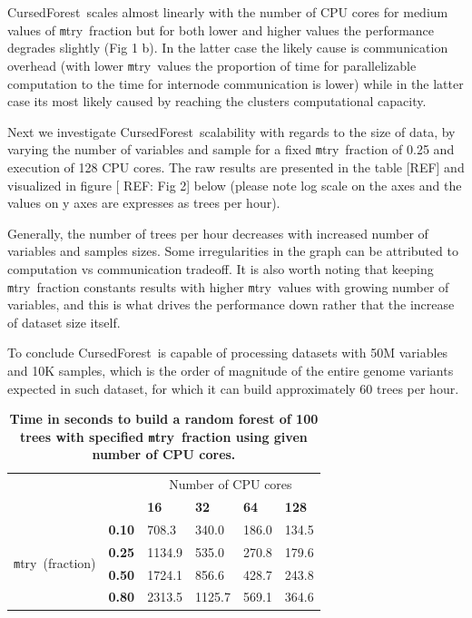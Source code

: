 \documentclass[10pt,letterpaper]{article}
\newcommand{\cursedforest}{{\sc CursedForest}}
\newcommand{\mtry}{{\texttt mtry}}
\begin{document}
\cursedforest{}ales almost linearly with the number of CPU cores for medium values of \mtry\ fraction but for both lower and higher values the performance degrades slightly (Fig 1 b). In the latter case the likely cause is communication overhead (with lower \mtry\ values the proportion of time for parallelizable computation to the time for internode communication is lower) while in the latter case its most likely caused by reaching the clusters computational capacity.

Next we investigate \cursedforest{}alability with regards to the size of data, by varying the number of variables and sample for a fixed \mtry\ fraction of 0.25 and execution of 128 CPU cores. The raw results are presented in the table [REF] and visualized in figure [ REF: Fig 2] below (please note log scale on the axes and the values on y axes are expresses as trees per hour).

Generally, the number of trees per hour decreases with increased number of variables and samples sizes. Some irregularities in the graph can be attributed to computation vs communication tradeoff. It is also worth noting that keeping \mtry\ fraction constants results with higher \mtry\ values with growing number of variables, and this is what drives the performance down rather that the increase of dataset size itself.


To conclude \cursedforest\ is capable of processing datasets with 50M variables and 10K samples, which is the order of magnitude of the entire genome variants expected in such dataset, for which it can build approximately 60 trees per hour.



\begin{table}[!ht]
\centering
\caption{
{\bf Time in seconds to build a random forest of 100
  trees with specified \mtry\ fraction using given number of CPU cores.}}
\begin{tabular}{|l|l|l|l|l|l|}
\hline
\multicolumn{2}{|l|}{\multirow{2}{*}{}}             & \multicolumn{4}{c|}{Number of CPU cores} \\
\cline{3-6}
\multicolumn{2}{|l|}{}                              & \bf{16} & \bf{32} & \bf{64} & \bf{128} \\
\hline
\multirow{4}{*}{\mtry\ (fraction)}        & \bf{0.10} & 708.3   & 340.0   & 186.0   & 134.5 \\
                                        & \bf{0.25} & 1134.9  & 535.0   & 270.8   & 179.6 \\
                                        & \bf{0.50} & 1724.1  & 856.6   & 428.7   & 243.8 \\
                                        & \bf{0.80} & 2313.5  & 1125.7  & 569.1   & 364.6 \\
\hline
\end{tabular}
\begin{flushleft} 
\end{flushleft}
\label{table10}
\end{table}
\end{document}
